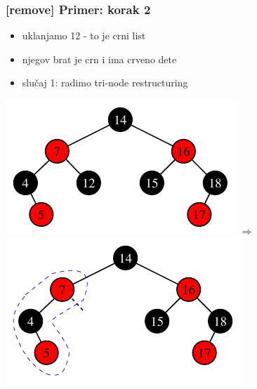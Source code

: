 \documentclass[compress,aspectratio=169]{beamer}
\begin{document}
\begin{frame}[fragile]
  \frametitle{[remove] Primer: korak 2}
  \begin{itemize}
    \item uklanjamo 12 - to je crni list
    \item njegov brat je crn i ima crveno dete
    \item slučaj 1: radimo tri-node restructuring
  \end{itemize}
  \begin{center}
    \includegraphics[scale=0.8]{asp-11-del-02.pdf} $\Rightarrow$
    \includegraphics[scale=0.8]{asp-11-del-03.pdf}
  \end{center}
\end{frame}
\end{document}
